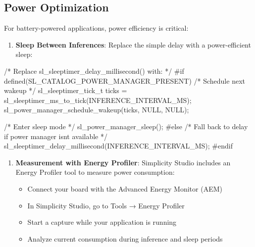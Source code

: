 \documentclass[
  9pt,
  letterpaper,
  abstract,
  titlepage]{scrbook}
\newenvironment{Shaded}{\begin{snugshade}}{\end{snugshade}}
\newcommand{\CommentTok}[1]{\textcolor[rgb]{0.37,0.37,0.37}{#1}}
\newcommand{\NormalTok}[1]{\textcolor[rgb]{0.00,0.23,0.31}{#1}}
\newcommand{\OperatorTok}[1]{\textcolor[rgb]{0.37,0.37,0.37}{#1}}
\newcommand{\PreprocessorTok}[1]{\textcolor[rgb]{0.68,0.00,0.00}{#1}}
\providecommand{\tightlist}{%
  \setlength{\itemsep}{0pt}\setlength{\parskip}{0pt}}\usepackage{longtable,booktabs,array}
\def\tightlist{}
\let\tightlist\relax
\begin{document}
\subsection{Power Optimization}\label{power-optimization}

For battery-powered applications, power efficiency is critical:

\begin{enumerate}
\def\labelenumi{\arabic{enumi}.}
\tightlist
\item
  \textbf{Sleep Between Inferences}: Replace the simple delay with a
  power-efficient sleep:
\end{enumerate}

\begin{Shaded}
\begin{Highlighting}[]
\CommentTok{/* Replace sl\_sleeptimer\_delay\_millisecond() with: */}
\PreprocessorTok{\#if defined(SL\_CATALOG\_POWER\_MANAGER\_PRESENT)}
  \CommentTok{/* Schedule next wakeup */}
\NormalTok{  sl\_sleeptimer\_tick\_t ticks }\OperatorTok{=}\NormalTok{ sl\_sleeptimer\_ms\_to\_tick}\OperatorTok{(}\NormalTok{INFERENCE\_INTERVAL\_MS}\OperatorTok{);}
\NormalTok{  sl\_power\_manager\_schedule\_wakeup}\OperatorTok{(}\NormalTok{ticks}\OperatorTok{,}\NormalTok{ NULL}\OperatorTok{,}\NormalTok{ NULL}\OperatorTok{);}
  
  \CommentTok{/* Enter sleep mode */}
\NormalTok{  sl\_power\_manager\_sleep}\OperatorTok{();}
\PreprocessorTok{\#else}
  \CommentTok{/* Fall back to delay if power manager isn\textquotesingle{}t available */}
\NormalTok{  sl\_sleeptimer\_delay\_millisecond}\OperatorTok{(}\NormalTok{INFERENCE\_INTERVAL\_MS}\OperatorTok{);}
\PreprocessorTok{\#endif}
\end{Highlighting}
\end{Shaded}

\begin{enumerate}
\def\labelenumi{\arabic{enumi}.}
\setcounter{enumi}{1}
\tightlist
\item
  \textbf{Measurement with Energy Profiler}: Simplicity Studio includes
  an Energy Profiler tool to measure power consumption:

  \begin{itemize}
  \tightlist
  \item
    Connect your board with the Advanced Energy Monitor (AEM)
  \item
    In Simplicity Studio, go to Tools → Energy Profiler
  \item
    Start a capture while your application is running
  \item
    Analyze current consumption during inference and sleep periods
  \end{itemize}
\end{enumerate}
\end{document}
